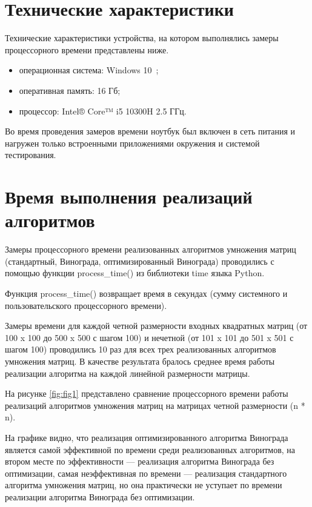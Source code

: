 \clearpage

\section{Технические характеристики}

Технические характеристики устройства, на котором выполнялись замеры процессорного времени представлены ниже.

\begin{itemize}
	\item операционная система: Windows 10~\cite{windows10};
	\item оперативная память: 16 Гб;
	\item процессор: Intel® Core™ i5 10300H 2.5 ГГц.
\end{itemize}

Во время проведения замеров времени ноутбук был включен в сеть питания и нагружен только встроенными приложениями окружения и системой тестирования.

\section{Время выполнения реализаций алгоритмов}

Замеры процессорного времени реализованных алгоритмов умножения матриц (стандартный, Винограда, оптимизированный Винограда) проводились с помощью функции process\_time() из библиотеки time языка Python. 

Функция process\_time() возвращает время в секундах (сумму системного и пользовательского процессорного времени).

Замеры времени для каждой четной размерности входных квадратных матриц (от 100 x 100 до 500 x 500 с шагом 100) и нечетной (от 101 x 101 до 501 x 501 с шагом 100) проводились 10 раз для всех трех реализованных алгоритмов умножения матриц. В качестве результата бралось среднее время работы реализации алгоритма на каждой линейной размерности матрицы.


На рисунке \ref{fig:fig1} представлено сравнение процессорного времени работы реализаций алгоритмов умножения матриц на матрицах четной размерности (n * n).

На графике видно, что реализация оптимизированного алгоритма Винограда является самой эффективной по времени среди реализованных алгоритмов, на втором месте по эффективности --- реализация алгоритма Винограда без оптимизации, самая неэффективная по времени --- реализация стандартного алгоритма умножения матриц, но она практически не уступает по времени реализации алгоритма Винограда без оптимизации.
\\
\\
\\
\\
\\
\\
\\
\\

